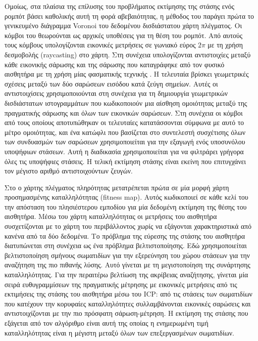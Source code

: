 Ομοίως, στα πλαίσια της επίλυσης του προβλήματος εκτίμησης της στάσης ενός
ρομπότ βάσει καθολικής αυτή τη φορά αβεβαιότητας, η μέθοδος του
\cite{Park2014a} παράγει πρώτα το γενικευμένο διάγραμμα Voronoi του δεδομένου
δισδιάστατου χάρτη πλέγματος. Οι κόμβοι του θεωρούνται ως αρχικές υποθέσεις για
τη θέση του ρομπότ. Από αυτούς τους κόμβους υπολογίζονται εικονικές μετρήσεις
σε γωνιακό εύρος $2\pi$ με τη χρήση δεσμοβολής (raycasting) στο χάρτη. Στη
συνέχεια υπολογίζονται αντιστοιχίες μεταξύ κάθε εικονικής σάρωσης και της
σάρωσης που καταγράφηκε από τον φυσικό αισθητήρα με τη χρήση μίας φασματικής
τεχνικής \cite{Leordeanu2005a}. Η τελευταία βρίσκει γεωμετρικές σχέσεις μεταξύ
των δύο σαρώσεων εισόδου κατά ζεύγη σημείων. Αυτές οι αντιστοιχίσεις
χρησιμοποιούνται στη συνέχεια για τη δημιουργία γεωμετρικών δισδιάστατων
ιστογραμμάτων που κωδικοποιούν μια αίσθηση ομοιότητας μεταξύ της πραγματικής
σάρωσης και όλων των εικονικών σαρώσεων. Στη συνέχεια οι κόμβοι από τους
οποίους αποτυπώθηκαν οι τελευταίες κατατάσσονται σύμφωνα με αυτό το μέτρο
ομοιότητας, και ένα κατώφλι που βασίζεται στο συντελεστή συσχέτισης όλων των
συνδυασμών των σαρώσεων χρησιμοποιείται για την εξαγωγή ενός υποσυνόλου
υποψήφιων στάσεων. Αυτή η διαδικασία χρησιμοποιείται για να φιλτράρει γρήγορα
όλες τις υποψήφιες στάσεις. Η τελική εκτίμηση στάσης είναι εκείνη που
επιτυγχάνει τον μέγιστο αριθμό αντιστοιχούντων ζευγών.

Στο \cite{Zhang2017a} ο χάρτης πλέγματος πληρότητας μετατρέπεται πρώτα σε μία
μορφή χάρτη προσημασμένης καταλληλότητας (fitness map). Αυτός κωδικοποιεί σε
κάθε κελί του την απόσταση του πλησιέστερου εμποδίου για μία δεδομένη εκτίμηση
της θέσης του αισθητήρα. Μέσω του χάρτη καταλληλότητας οι μετρήσεις του
αισθητήρα συσχετίζονται με το χάρτη του περιβάλλοντος χωρίς να εξάγονται
χαρακτηριστικά από κανένα από τα δύο δεδομένα. Το πρόβλημα της εύρεσης της
στάσης του αισθητήρα διατυπώνεται στη συνέχεια ως ένα πρόβλημα βελτιστοποίησης.
Εδώ χρησιμοποιείται βελτιστοποίηση σμήνους σωματιδίων για την εξερεύνηση του
χώρου στάσεων για την αναζήτηση της πιο πιθανής λύσης. Αυτό γίνεται με τη
μεγιστοποίηση της συνάρτησης καταλληλότητας. Για την περαιτέρω βελτίωση της
ακρίβειας αναζήτησης, γίνεται μία σειρά ευθυγραμμίσεων της πραγματικής μέτρησης
με εικονικές μετρήσεις από τις εκτιμήσεις της στάσης του αισθητήρα μέσω του
ICP: από τις στάσεις των σωματιδίων που κατέχουν την κορυφαίες καταλληλότητες
συλλαμβάνονται εικονικές σαρώσεις και αντιστοιχίζονται με την πιο πρόσφατη
σάρωση-μέτρηση. Η εκτίμηση της στάσης που εξάγεται από τον αλγόριθμο είναι
αυτή της οποίας η ενημερωμένη τιμή καταλληλότητας είναι η μέγιστη μεταξύ όλων
των επεξεργασμένων σωματιδίων.

